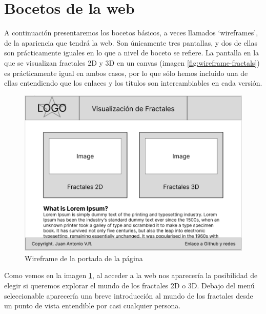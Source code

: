 \section*{Bocetos de la web}

A continuación presentaremos los bocetos básicos, a veces llamados `wireframes', de la apariencia que tendrá la web. Son únicamente tres pantallas, y dos de ellas son prácticamente iguales en lo que a nivel de boceto se refiere. La pantalla en la que se visualizan fractales 2D y 3D en un canvas (imagen \ref{fig:wireframe-fractals}) es prácticamente igual en ambos casos, por lo que sólo hemos incluido una de ellas entendiendo que los enlaces y los títulos son intercambiables en cada versión. 

\begin{figure} [ht]
\centering
\includegraphics[scale = 0.4]{img/wireframe-home.png}
\caption{Wireframe de la portada de la página}
\label{fig:wireframe-home}
\end{figure}

Como vemos en la imagen \ref{fig:wireframe-home}, al acceder a la web nos aparecería la posibilidad de elegir si queremos explorar el mundo de los fractales 2D o 3D. Debajo del menú seleccionable aparecería una breve introducción al mundo de los fractales desde un punto de vista entendible por casi cualquier persona.

